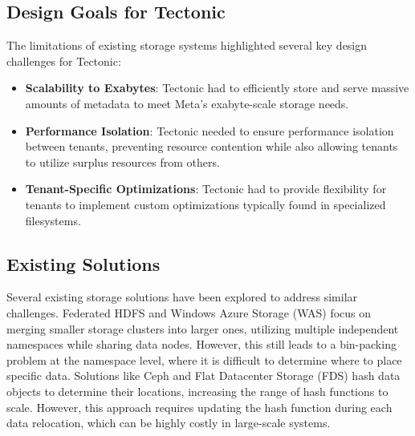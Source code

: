 \subsection{Design Goals for Tectonic}\label{sec:design_goals}
The limitations of existing storage systems highlighted several key design challenges for Tectonic:
\begin{itemize}\label{design_challenges}
    \item \textbf{Scalability to Exabytes}: Tectonic had to efficiently store and serve massive amounts of metadata to meet Meta's exabyte-scale storage needs.
    \item \textbf{Performance Isolation}: Tectonic needed to ensure performance isolation between tenants, preventing resource contention while also allowing tenants to utilize surplus resources from others.
    \item \textbf{Tenant-Specific Optimizations}: Tectonic had to provide flexibility for tenants to implement custom optimizations typically found in specialized filesystems.
\end{itemize}

\subsection{Existing Solutions}\label{sec:existing_solutions}
Several existing storage solutions have been explored to address similar challenges. Federated HDFS\cite{hadoop_federation} and Windows Azure Storage (WAS)\cite{azure} focus on merging smaller storage clusters into larger ones, utilizing multiple independent namespaces while sharing data nodes. However, this still leads to a bin-packing problem at the namespace level, where it is difficult to determine where to place specific data. Solutions like Ceph\cite{ceph} and Flat Datacenter Storage (FDS)\cite{fds} hash data objects to determine their locations, increasing the range of hash functions to scale. However, this approach requires updating the hash function during each data relocation, which can be highly costly in large-scale systems.
